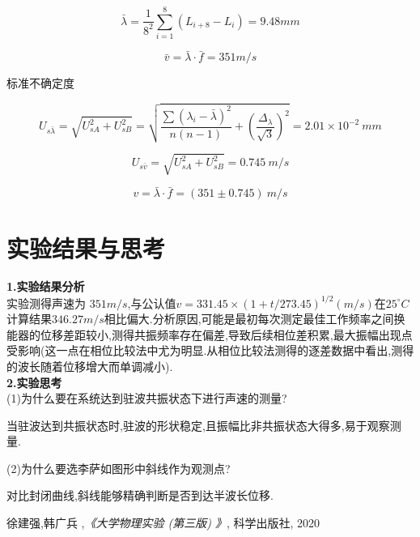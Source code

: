 \documentclass[12pt,a4paper,oneside,UTF8]{ctexart}
\begin{document}
$$ \bar \lambda = \dfrac{1}{8^2} \sum_{i=1}^{8} (L_{i+8} - L_i) = 9.48 mm $$ 

$$ \bar v = \bar \lambda \cdot \bar f  = 351 m/s$$

\noindent 标准不确定度

$$ U_{s\bar \lambda} = \sqrt{U_{sA}^2 + U_{sB}^2} = \sqrt{\dfrac{\sum (\lambda_i - \bar \lambda)^2}{n(n-1)} + (\dfrac{\Delta_{\lambda}}{\sqrt{3}})^2} = 2.01 \times 10^{-2} ~ mm$$

$$ U_{s\bar v} = \sqrt{U^2_{sA} + U^2_{sB}} = 0.745 ~ m/s$$

$$ v = \bar \lambda \cdot \bar f  = (351 \pm 0.745) ~ m/s$$

\section{实验结果与思考}

\textbf{1.实验结果分析}\\

实验测得声速为  $ 351 m/s $,与公认值$v = 331.45 \times (1+t/273.45)^{1/2} (m/s)$在$25^{\circ} C$计算结果$346.27 m/s$相比偏大.分析原因,可能是最初每次测定最佳工作频率之间换能器的位移差距较小,测得共振频率存在偏差,导致后续相位差积累,最大振幅出现点受影响(这一点在相位比较法中尤为明显.从相位比较法测得的逐差数据中看出,测得的波长随着位移增大而单调减小).\\

\textbf{2.实验思考}\\

(1)为什么要在系统达到驻波共振状态下进行声速的测量?

当驻波达到共振状态时,驻波的形状稳定,且振幅比非共振状态大得多,易于观察测量.

(2)为什么要选李萨如图形中斜线作为观测点?

对比封闭曲线,斜线能够精确判断是否到达半波长位移.


\begin{thebibliography}{9}
	  徐建强,韩广兵 ,\textit{《大学物理实验 (第三版) 》}, 科学出版社, 2020
\end{thebibliography}
\end{document}
